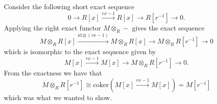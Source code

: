 \documentclass[a4paper]{article}
\begin{document}
\begin{exercise}{4}
  Consider the following short exact sequence
  \begin{equation*}
    0 \to R[x] \xrightarrow{rx - 1} R[x] \to R[r^{-1}] \to 0
  .\end{equation*}
  Applying the right exact functor $ M \otimes_{R} - $ gives the exact sequence
  \begin{equation*}
    M\otimes_{R} R[x] \xrightarrow{\text{id} \otimes (rx - 1)} M \otimes_{R} R[x] \to M \otimes_{R} R[r^{-1}] \to 0
  \end{equation*}
  which is isomorphic to the exact sequence given by
  \begin{equation*}
    M[x] \xrightarrow{rx - 1} M[x] \to M \otimes_{R}R[r^{-1}] \to 0
  .\end{equation*}
  From the exactness we have that
  \begin{equation*}
    M \otimes_{R}R[r^{-1}] \cong \text{coker}(M[x] \xrightarrow{rx-1} M[x]) = M[r^{-1}]
  \end{equation*}
  which was what we wanted to show.
\end{exercise}
\end{document}
